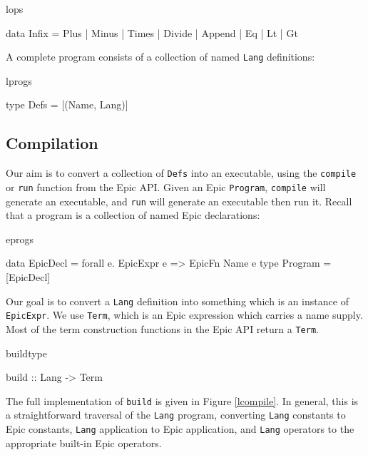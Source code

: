 \begin{SaveVerbatim}{lops}

data Infix = Plus | Minus | Times | Divide | Append | Eq | Lt | Gt

\end{SaveVerbatim}

\noindent
A complete program consists of a collection of named \texttt{Lang}
definitions:

\begin{SaveVerbatim}{lprogs}

type Defs = [(Name, Lang)]
\end{SaveVerbatim}

\vspace*{0.5em}
\subsection{Compilation}

Our aim is to convert a collection of \texttt{Defs} into an
executable, using the \texttt{compile} or \texttt{run} function from
the Epic API.
Given an Epic \texttt{Program}, \texttt{compile} will generate an
executable, and \texttt{run} will generate an executable then run it.
Recall that a program is a collection of named Epic declarations:

\begin{SaveVerbatim}{eprogs}

data EpicDecl = forall e. EpicExpr e => EpicFn Name e
type Program = [EpicDecl]

\end{SaveVerbatim}

\noindent
Our goal is to convert a \texttt{Lang} definition into
something which is an instance of \texttt{EpicExpr}. We use
\texttt{Term}, which is an Epic expression which carries a name
supply. Most of the term construction functions in the Epic API return
a \texttt{Term}.

\begin{SaveVerbatim}{buildtype}

build :: Lang -> Term

\end{SaveVerbatim}

\noindent
The full implementation of \texttt{build} is given in Figure \ref{lcompile}.
In general, this is a straightforward traversal of the \texttt{Lang}
program, converting \texttt{Lang} constants to Epic constants,
\texttt{Lang} application to Epic application, and \texttt{Lang}
operators to the appropriate built-in Epic operators. 
                  
